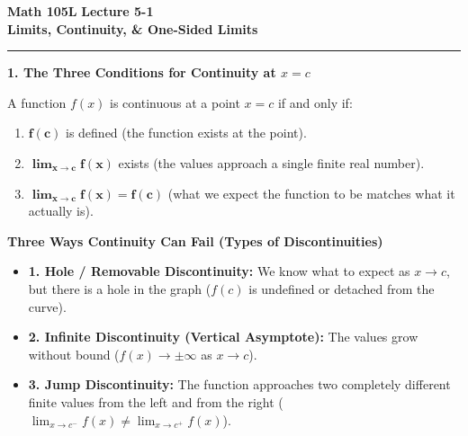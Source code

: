 \documentclass[10.5pt]{article}
\begin{document}
\noindent \textbf{\large Math 105L} \hfill \textbf{\large Lecture 5-1}\\[1pt]
{\textbf{\Large Limits, Continuity, \& One-Sided Limits}}\\[-5pt]
\rule{\textwidth}{1.2pt}

\vspace{0.03in}

\textbf{\large 1. The Three Conditions for Continuity at $x = c$}

A function $f(x)$ is continuous at a point $x = c$ if and only if:
\begin{enumerate}[leftmargin=1.4em, topsep=1pt, itemsep=2pt]
  \item $\mathbf{f(c)}$ is defined (the function exists at the point).
  \item $\mathbf{\lim_{x\to c} f(x)}$ exists (the values approach a single finite real number).
  \item $\mathbf{\lim_{x\to c} f(x) = f(c)}$ (what we expect the function to be matches what it actually is).
\end{enumerate}

\vspace{0.03in}

\begin{tcolorbox}[colback=boxbg, colframe=boxframe, boxrule=0.8pt, arc=3pt, left=8pt, right=8pt, top=4pt, bottom=4pt]
\textbf{\large Three Ways Continuity Can Fail (Types of Discontinuities)}
\begin{itemize}[leftmargin=1.2em, topsep=2pt, itemsep=4pt]
  \item \textbf{1. Hole / Removable Discontinuity:}
    We know what to expect as $x \to c$, but there is a hole in the graph ($f(c)$ is undefined or detached from the curve).
  \item \textbf{2. Infinite Discontinuity (Vertical Asymptote):}
    The values grow without bound ($f(x) \to \pm\infty$ as $x \to c$).
  \item \textbf{3. Jump Discontinuity:}
    The function approaches two completely different finite values from the left and from the right ($\lim_{x\to c^-} f(x) \ne \lim_{x\to c^+} f(x)$).
\end{itemize}
\end{tcolorbox}

\vspace{0.04in}
\end{document}
